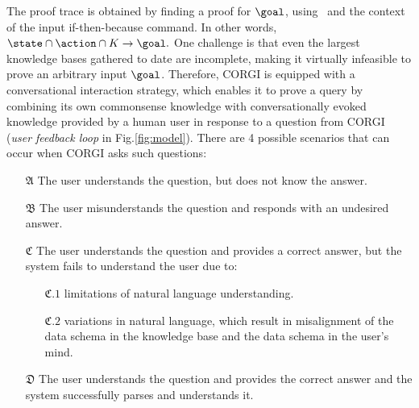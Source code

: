 The proof trace is obtained by
finding a proof for $\goal$, using 
\KB~and the context of the input if-then-because command. In other words, $\state \cap \action \cap K \rightarrow \goal.$
One challenge is that even the largest knowledge bases gathered to date are incomplete, making it virtually infeasible to prove an arbitrary input $\goal$. Therefore, CORGI is equipped with a conversational interaction strategy, which enables it to prove a query by combining its own commonsense knowledge with conversationally evoked knowledge provided by a human user in response to a question from CORGI (\emph{user feedback loop} in Fig.\ref{fig:model}).
There are 4 possible scenarios that can occur when CORGI asks such questions:
\vspace{-0.5em}
\begin{itemize}%
    \item[$\mathfrak{A}$] The user understands the question, but does not know the answer.
    \vspace{-0.4em}
    \item[$\mathfrak{B}$] The user misunderstands the question and responds with an undesired answer.
    \vspace{-0.4em}
    \item[$\mathfrak{C}$] The user understands the question and provides a correct answer, but the system fails to understand the user due to:
    \vspace{-0.4em}
    \begin{itemize}
        \item[$\mathfrak{C}.1$] limitations of natural language understanding.
        \vspace{-0.2em}
        \item[$\mathfrak{C}.2$] variations in natural language, which result in misalignment of the data schema in the knowledge base and the data schema in the user's mind.
    \end{itemize}
    \vspace{-0.5em}
    \item[$\mathfrak{D}$] The user understands the question and provides the correct answer and the system successfully parses and understands it.
\end{itemize}
